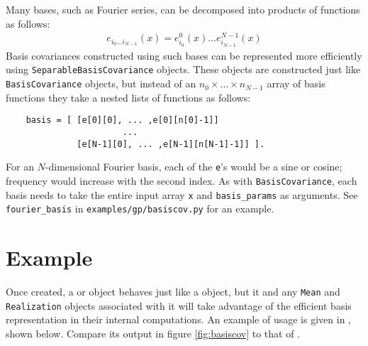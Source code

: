 Many bases, such as Fourier series, can be decomposed into products of functions as follows:
\begin{eqnarray*}
    e_{i_0\ldots i_{N-1}}(x) = e^0_{i_0}(x)\ldots e^{N-1}_{i_{N-1}}(x)
\end{eqnarray*}
Basis covariances constructed using such bases can be represented more efficiently using \texttt{SeparableBasisCovariance} objects. These objects are constructed just like \texttt{BasisCovariance} objects, but instead of an $n_0\times \ldots \times n_{N-1}$ array of basis functions they take a nested lists of functions as follows:
\begin{verbatim}
    basis = [ [e[0][0], ... ,e[0][n[0]-1]]
                       ...
              [e[N-1][0], ... ,e[N-1][n[N-1]-1]] ].
\end{verbatim}
For an $N$-dimensional Fourier basis, each of the \texttt{e}'s would be a sine or cosine; frequency would increase with the second index. As with \texttt{BasisCovariance}, each basis needs to take the entire input array \texttt{x} and \texttt{basis_params} as arguments. See \texttt{fourier_basis} in \texttt{examples/gp/basiscov.py} for an example.

\section{Example}

Once created, a  or  object behaves just like a  object, but it and any \texttt{Mean} and \texttt{Realization} objects associated with it will take advantage of the efficient basis representation in their internal computations. An example of  usage is given in , shown below. Compare its output in figure \ref{fig:basiscov} to that of .

